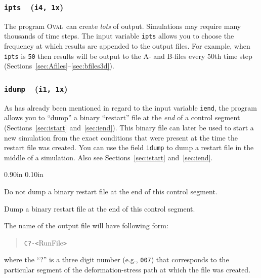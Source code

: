 \documentclass[letterpaper,11pt]{article}
\newcommand{\Oval}{\textsc{Oval}}
\newcommand{\Var}[2]{\texttt{#1}\ \  (\texttt{#2})}
\newcommand{\RunFile}{\textsf{RunFile}}
\newlength{\Labelwidth}
\newcommand{\Entrylabel}[1]{\makebox[\Labelwidth][r]{\texttt{#1}}}
\newenvironment{Options}
{\begin{list}{}{%
\renewcommand{\makelabel}{\Entrylabel}%
\setlength{\leftmargin} {0.90in}%
\setlength{\rightmargin}{0.00in}%
\setlength{\labelsep}   {0.10in}%
\setlength{\labelwidth} {\Labelwidth}%
}}
{\end{list}}
\begin{document}
\subsubsection[\texttt{ipts}]{\Var{ipts}{i4, 1x}}\label{sec:ipts}
The program \Oval\ can create \emph{lots} of output.
Simulations may require many thousands of time steps.
The input variable \texttt{ipts} allows you to choose
the frequency at which results are appended to the
output files.
For example, when \texttt{ipts} is \texttt{50} then
results will be output 
to the A- and B-files every 50th time step
(Sections~\ref{sec:Afiles}--\ref{sec:bfiles3d}).
%
\subsubsection[\texttt{idump}]{\Var{idump}{i1, 1x}}\label{sec:idump}
As has already been mentioned in regard to the input variable \texttt{iend},
the program allows you to ``dump'' a binary ``restart'' file at the
\emph{end} of a control segment (Sections~\ref{sec:istart} 
and~\ref{sec:iend}).
This binary file can later be used to start a new simulation from the
exact conditions that were present at the time the restart file was
created.
You can use the field \texttt{idump} to dump a restart file in the
middle of a simulation.
Also see Sections~\ref{sec:istart} and~\ref{sec:iend}.
\begin{Options}
\item[idump=0]
Do not dump a binary restart file at the end of this control segment.
\item[idump=1]
Dump a binary restart file at the end of this control segment.
\end{Options}
The name of the output file will have following form:
\begin{quote}
\texttt{C?-<}\RunFile\texttt{>}
\end{quote}
where the ``?'' is a three digit number (e.g., \texttt{007}) 
that corresponds to the particular
segment of the deformation-stress path at which the file was created.
%
\end{document}
